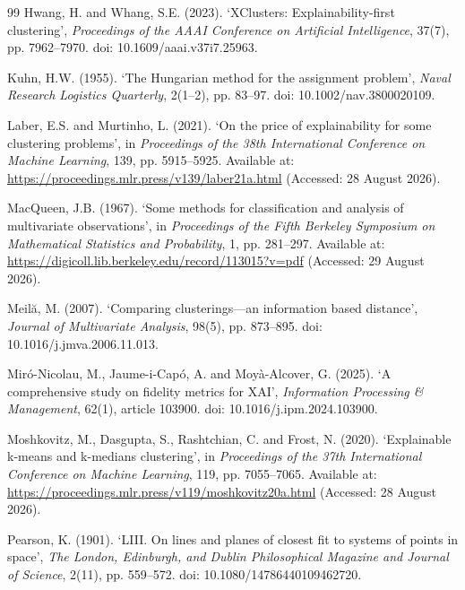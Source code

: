 \begin{thebibliography}{99}
Hwang, H. and Whang, S.E. (2023). `XClusters: Explainability-first clustering', \emph{Proceedings of the AAAI Conference on Artificial Intelligence}, 37(7), pp. 7962--7970. doi: 10.1609/aaai.v37i7.25963.

Kuhn, H.W. (1955). `The Hungarian method for the assignment problem', \emph{Naval Research Logistics Quarterly}, 2(1--2), pp. 83--97. doi: 10.1002/nav.3800020109.

Laber, E.S. and Murtinho, L. (2021). `On the price of explainability for some clustering problems', in \emph{Proceedings of the 38th International Conference on Machine Learning}, 139, pp. 5915--5925. Available at: \url{https://proceedings.mlr.press/v139/laber21a.html} (Accessed: 28 August 2026).

MacQueen, J.B. (1967). `Some methods for classification and analysis of multivariate observations', in \emph{Proceedings of the Fifth Berkeley Symposium on Mathematical Statistics and Probability}, 1, pp. 281--297. Available at: \url{https://digicoll.lib.berkeley.edu/record/113015?v=pdf} (Accessed: 29 August 2026).

Meil{\u a}, M. (2007). `Comparing clusterings---an information based distance', \emph{Journal of Multivariate Analysis}, 98(5), pp. 873--895. doi: 10.1016/j.jmva.2006.11.013.

Mir{\'o}-Nicolau, M., Jaume-i-Cap{\'o}, A. and Moy{\`a}-Alcover, G. (2025). `A comprehensive study on fidelity metrics for XAI', \emph{Information Processing \& Management}, 62(1), article 103900. doi: 10.1016/j.ipm.2024.103900.

Moshkovitz, M., Dasgupta, S., Rashtchian, C. and Frost, N. (2020). `Explainable k-means and k-medians clustering', in \emph{Proceedings of the 37th International Conference on Machine Learning}, 119, pp. 7055--7065. Available at: \url{https://proceedings.mlr.press/v119/moshkovitz20a.html} (Accessed: 28 August 2026).

Pearson, K. (1901). `LIII. On lines and planes of closest fit to systems of points in space', \emph{The London, Edinburgh, and Dublin Philosophical Magazine and Journal of Science}, 2(11), pp. 559--572. doi: 10.1080/14786440109462720.


\end{thebibliography}
